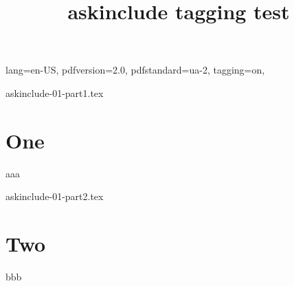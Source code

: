 \ifdefined\Uchar\RequirePackage{luatagging}\fi
\DocumentMetadata
  {
    lang=en-US,
    pdfversion=2.0,
    pdfstandard=ua-2,
    tagging=on,
  }
\begin{filecontents}[overwrite]{askinclude-01-part1.tex}
\chapter{One}
aaa
\end{filecontents}
\begin{filecontents}[overwrite]{askinclude-01-part2.tex}
\chapter{Two}
bbb
\end{filecontents}
\def\typein[#1]#2{\typeout{#2}\def#1{*}}
\documentclass{report}
\usepackage{askinclude}

\title{askinclude tagging test}



Some intro text



